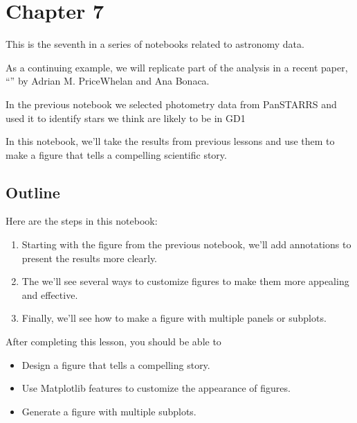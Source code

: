 \documentclass[letterpaper,10pt,english]{sphinxmanual}
\begin{document}
\chapter{Chapter 7}
\label{\detokenize{07_plot:chapter-7}}\label{\detokenize{07_plot::doc}}
This is the seventh in a series of notebooks related to astronomy data.

As a continuing example, we will replicate part of the analysis in a recent paper, “” by Adrian M. Price\sphinxhyphen{}Whelan and Ana Bonaca.

In the previous notebook we selected photometry data from Pan\sphinxhyphen{}STARRS and used it to identify stars we think are likely to be in GD\sphinxhyphen{}1

In this notebook, we’ll take the results from previous lessons and use them to make a figure that tells a compelling scientific story.


\section{Outline}
\label{\detokenize{07_plot:outline}}
Here are the steps in this notebook:
\begin{enumerate}
%
\item {} 
Starting with the figure from the previous notebook, we’ll add annotations to present the results more clearly.

\item {} 
The we’ll see several ways to customize figures to make them more appealing and effective.

\item {} 
Finally, we’ll see how to make a figure with multiple panels or subplots.

\end{enumerate}

After completing this lesson, you should be able to
\begin{itemize}
\item {} 
Design a figure that tells a compelling story.

\item {} 
Use Matplotlib features to customize the appearance of figures.

\item {} 
Generate a figure with multiple subplots.

\end{itemize}
\end{document}
